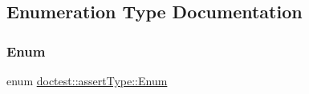 \subsection{Enumeration Type Documentation}
\mbox{\label{namespacedoctest_1_1assertType_ae1bb5bed722f34f1c38b83cb19d326d3}} 
\subsubsection{\texorpdfstring{Enum}{Enum}}
{\footnotesize\ttfamily enum \hyperlink{namespacedoctest_1_1assertType_ae1bb5bed722f34f1c38b83cb19d326d3}{doctest\+::assert\+Type\+::\+Enum}}

